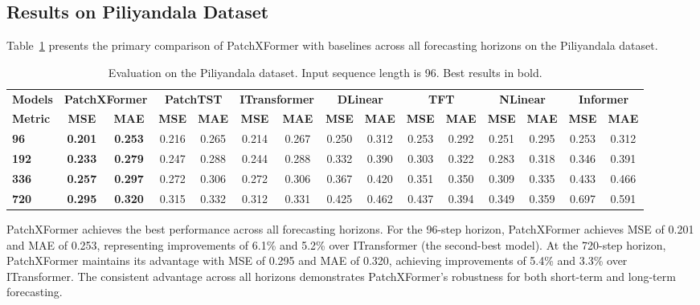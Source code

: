 \documentclass[a4paper,fleqn]{cas-dc}
\begin{document}
\subsection{Results on Piliyandala Dataset}

Table~\ref{tab:main_results} presents the primary comparison of PatchXFormer with baselines across all forecasting horizons on the Piliyandala dataset.

\begin{table}[width=.9\linewidth,pos=h]
\caption{Evaluation on the Piliyandala dataset. Input sequence length is 96. Best results in bold.}\label{tab:main_results}
\begin{tabular*}{\tblwidth}{@{} lcccccccccccccc@{} }
\toprule
\textbf{Models} & \multicolumn{2}{c}{\textbf{PatchXFormer}} & \multicolumn{2}{c}{\textbf{PatchTST}} & \multicolumn{2}{c}{\textbf{ITransformer}} & \multicolumn{2}{c}{\textbf{DLinear}} & \multicolumn{2}{c}{\textbf{TFT}} & \multicolumn{2}{c}{\textbf{NLinear}} & \multicolumn{2}{c}{\textbf{Informer}} \\
\textbf{Metric} & \textbf{MSE} & \textbf{MAE} & \textbf{MSE} & \textbf{MAE} & \textbf{MSE} & \textbf{MAE} & \textbf{MSE} & \textbf{MAE} & \textbf{MSE} & \textbf{MAE} & \textbf{MSE} & \textbf{MAE} & \textbf{MSE} & \textbf{MAE} \\
\midrule
\textbf{96}  & \textbf{0.201} & \textbf{0.253} & 0.216 & 0.265 & 0.214 & 0.267 & 0.250 & 0.312 & 0.253 & 0.292 & 0.251 & 0.295 & 0.253 & 0.312\\
\textbf{192} & \textbf{0.233} & \textbf{0.279} & 0.247 & 0.288 & 0.244 & 0.288 & 0.332 & 0.390 & 0.303 & 0.322 & 0.283 & 0.318 & 0.346 & 0.391\\
\textbf{336} & \textbf{0.257} & \textbf{0.297} & 0.272 & 0.306 & 0.272 & 0.306 & 0.367 & 0.420 & 0.351 & 0.350 & 0.309 & 0.335 & 0.433 & 0.466\\
\textbf{720} & \textbf{0.295} & \textbf{0.320} & 0.315 & 0.332 & 0.312 & 0.331 & 0.425 & 0.462 & 0.437 & 0.394 & 0.349 & 0.359 & 0.697 & 0.591\\
\bottomrule
\end{tabular*}
\end{table}

PatchXFormer achieves the best performance across all forecasting horizons. For the 96-step horizon, PatchXFormer achieves MSE of 0.201 and MAE of 0.253, representing improvements of 6.1\% and 5.2\% over ITransformer (the second-best model). At the 720-step horizon, PatchXFormer maintains its advantage with MSE of 0.295 and MAE of 0.320, achieving improvements of 5.4\% and 3.3\% over ITransformer. The consistent advantage across all horizons demonstrates PatchXFormer's robustness for both short-term and long-term forecasting.
\end{document}

